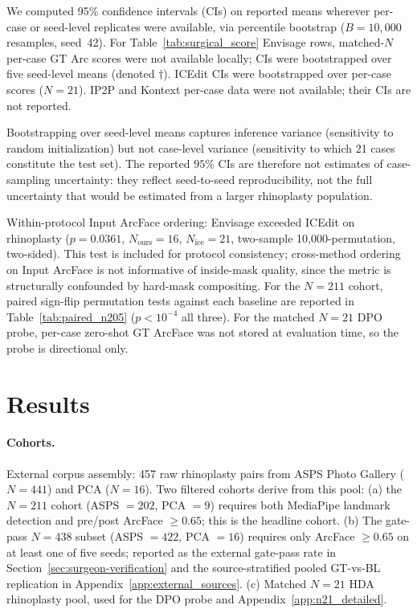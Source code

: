 \documentclass{article}
\newcommand{\method}{Envisage}
\begin{document}
We computed 95\% confidence intervals (CIs) on reported means wherever per-case
or seed-level replicates were available, via percentile bootstrap ($B{=}10{,}000$
resamples, seed~42). For Table~\ref{tab:surgical_score}
\method{} rows, matched-$N$ per-case GT Arc scores were not available locally;
CIs were bootstrapped over five seed-level means (denoted $\dagger$). ICEdit
CIs were bootstrapped over per-case scores ($N{=}21$). IP2P and Kontext
per-case data were not available; their CIs are not reported.

Bootstrapping over seed-level means captures inference variance (sensitivity to
random initialization) but not case-level variance (sensitivity to which 21
cases constitute the test set). The reported $95\%$ CIs are therefore not estimates
of case-sampling uncertainty: they reflect seed-to-seed reproducibility, not
the full uncertainty that would be estimated from a larger rhinoplasty population.

Within-protocol Input ArcFace ordering: \method{} exceeded ICEdit on rhinoplasty
($p{=}0.0361$, $N_{\text{ours}}{=}16$, $N_{\text{ice}}{=}21$, two-sample 10,000-permutation, two-sided).
This test is included for protocol consistency; cross-method ordering on Input ArcFace is
not informative of inside-mask quality, since the metric is structurally confounded by
hard-mask compositing. For the $N{=}211$ cohort, paired sign-flip permutation tests against each
baseline are reported in Table~\ref{tab:paired_n205} ($p < 10^{-4}$ all three).
For the matched $N{=}21$ DPO probe, per-case zero-shot GT ArcFace was not stored
at evaluation time, so the probe is directional only.

\section{Results}
\label{sec:results}

\paragraph{Cohorts.} External corpus assembly: 457 raw rhinoplasty pairs from
ASPS Photo Gallery ($N{=}441$) and PCA ($N{=}16$). Two filtered cohorts derive
from this pool: (a) the $N{=}211$ cohort (ASPS $=202$, PCA $=9$)
requires both MediaPipe landmark detection and pre/post ArcFace $\geq 0.65$;
this is the headline cohort. (b) The gate-pass $N{=}438$ subset
(ASPS $=422$, PCA $=16$) requires only ArcFace $\geq 0.65$ on at least one
of five seeds; reported as the external gate-pass rate in
Section~\ref{sec:surgeon-verification} and the source-stratified pooled
GT-vs-BL replication in Appendix~\ref{app:external_sources}. (c) Matched $N{=}21$ HDA rhinoplasty
pool, used for the DPO probe and Appendix~\ref{app:n21_detailed}.
\end{document}

